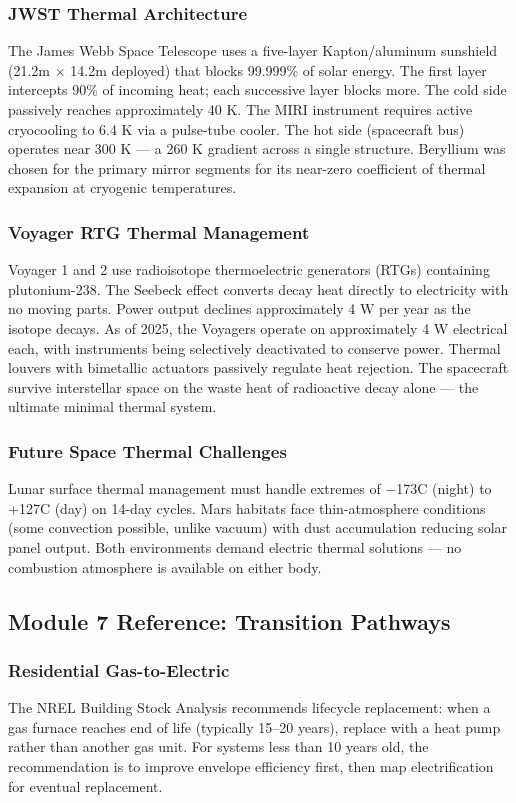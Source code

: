 \documentclass[11pt,letterpaper]{article}
\begin{document}
\subsubsection{JWST Thermal Architecture}
The James Webb Space Telescope uses a five-layer Kapton/aluminum sunshield (21.2m $\times$ 14.2m deployed) that blocks 99.999\% of solar energy. The first layer intercepts 90\% of incoming heat; each successive layer blocks more. The cold side passively reaches approximately 40 K. The MIRI instrument requires active cryocooling to 6.4 K via a pulse-tube cooler. The hot side (spacecraft bus) operates near 300 K --- a 260 K gradient across a single structure. Beryllium was chosen for the primary mirror segments for its near-zero coefficient of thermal expansion at cryogenic temperatures.

\subsubsection{Voyager RTG Thermal Management}
Voyager 1 and 2 use radioisotope thermoelectric generators (RTGs) containing plutonium-238. The Seebeck effect converts decay heat directly to electricity with no moving parts. Power output declines approximately 4 W per year as the isotope decays. As of 2025, the Voyagers operate on approximately 4 W electrical each, with instruments being selectively deactivated to conserve power. Thermal louvers with bimetallic actuators passively regulate heat rejection. The spacecraft survive interstellar space on the waste heat of radioactive decay alone --- the ultimate minimal thermal system.

\subsubsection{Future Space Thermal Challenges}
Lunar surface thermal management must handle extremes of $-$173\textdegree C (night) to +127\textdegree C (day) on 14-day cycles. Mars habitats face thin-atmosphere conditions (some convection possible, unlike vacuum) with dust accumulation reducing solar panel output. Both environments demand electric thermal solutions --- no combustion atmosphere is available on either body.

\subsection{Module 7 Reference: Transition Pathways}

\subsubsection{Residential Gas-to-Electric}
The NREL Building Stock Analysis recommends lifecycle replacement: when a gas furnace reaches end of life (typically 15--20 years), replace with a heat pump rather than another gas unit. For systems less than 10 years old, the recommendation is to improve envelope efficiency first, then map electrification for eventual replacement.
\end{document}
